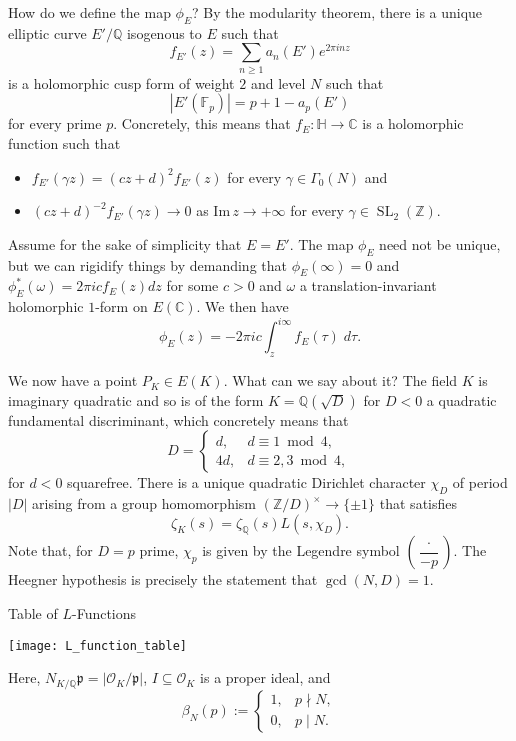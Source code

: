 \documentclass[aspectratio=1610]{beamer}
\renewcommand{\O}{\mathcal{O}}
\renewcommand{\subset}{\subseteq}
\renewcommand{\Im}{\textrm{Im}}
\newcommand{\C}{\mathbb{C}}
\newcommand{\F}{\mathbb{F}}
\newcommand{\HH}{\mathbb{H}}
\newcommand{\Q}{\mathbb{Q}}
\newcommand{\Z}{\mathbb{Z}}
\newcommand{\df}{\dfrac}
\newcommand{\mf}{\mathfrak}
\DeclareMathOperator{\SL}{SL}
\begin{document}
\begin{frame}
How do we define the map $\phi_E$? By the modularity theorem, there is a unique elliptic curve $E'/\Q$ isogenous to $E$ such that 
$$f_{E'}(z)=\sum_{n\geq1}a_n(E')e^{2\pi inz}$$
is a holomorphic cusp form of weight $2$ and level $N$ such that 
$$|E'(\F_p)|=p+1-a_p(E')$$ 
for every prime $p$. Concretely, this means that $f_E: \HH\to\C$ is a holomorphic function such that
\begin{itemize}
\item $f_{E'}(\gamma z)=(cz+d)^2f_{E'}(z)$ for every $\gamma\in\Gamma_0(N)$ and
\item $(cz+d)^{-2}f_{E'}(\gamma z)\to0$ as $\Im\,z\to+\infty$ for every $\gamma\in\SL_2(\Z)$. 
\end{itemize}
Assume for the sake of simplicity that $E=E'$. The map $\phi_E$ need not be unique, but we can rigidify things by demanding that $\phi_E(\infty)=0$ and $\phi_E^*(\omega)=2\pi icf_E(z)dz$ for some $c>0$ and $\omega$ a translation-invariant holomorphic $1$-form on $E(\C)$. We then have
$$\phi_E(z)=-2\pi ic\int_z^{i\infty}f_E(\tau)\;d\tau.$$
\end{frame}

\begin{frame}
We now have a point $P_K\in E(K)$. What can we say about it? The field $K$ is imaginary quadratic and so is of the form $K=\Q(\sqrt{D})$ for $D<0$ a quadratic fundamental discriminant, which concretely means that 
\begin{equation*}
D=
\begin{cases}
d, & d\equiv 1\bmod 4, \\
4d, & d\equiv 2,3\bmod 4,
\end{cases}
\end{equation*}
for $d<0$ squarefree. There is a unique quadratic Dirichlet character $\chi_D$ of period $|D|$ arising from a group homomorphism $(\Z/D)^{\times}\to\{\pm1\}$ that satisfies 
$$\zeta_K(s)=\zeta_{\Q}(s)L(s,\chi_D).$$
Note that, for $D=p$ prime, $\chi_p$ is given by the Legendre symbol $\left(\df{\cdot}{-p}\right)$. The Heegner hypothesis is precisely the statement that $\gcd(N,D)=1$.
\end{frame}

\begin{frame}{Table of $L$-Functions}
\begin{center}
\texttt{[image: L\_function\_table]}
\end{center}
Here, $N_{K/\Q}\mf{p}=|\O_K/\mf{p}|$, $I\subset\O_K$ is a proper ideal, and 
\begin{equation*}
\beta_N(p):=
\begin{cases}
1, & p\nmid N, \\
0, & p\mid N.
\end{cases}
\end{equation*}
\end{frame}
\end{document}
